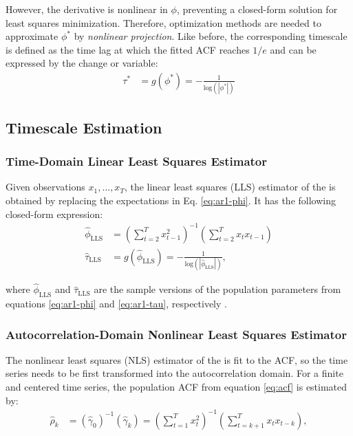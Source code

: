 \documentclass[main.tex]{subfiles}
\begin{document}
\noindent However, the derivative is nonlinear in $\phi$, preventing a closed-form solution for least squares minimization. Therefore, optimization methods are needed to approximate $\phi^*$ by \textit{nonlinear projection}. Like before, the corresponding timescale is defined as the time lag at which the fitted ACF reaches $1/e$ and can be expressed by the change or variable:
\begin{align}
    \tau^* &= g(\phi^*) = -\frac{1}{\text{log}(|\phi^*|)} \label{eq:nlm-tau}
\end{align}

\subsection{Timescale Estimation}\label{sec:timescale-estimation}
\subsubsection{Time-Domain Linear Least Squares Estimator}
Given observations $x_1, \ldots, x_T$, the linear least squares (LLS) estimator of the  is obtained by replacing the expectations in Eq. \eqref{eq:ar1-phi}. It has the following closed-form expression:
\begin{align}
    \hat\phi_{\scriptscriptstyle\text{LLS}} &= \left(\sum_{t=2}^T x_{t-1}^2\right)^{-1} \left(\sum_{t=2}^T x_t x_{t-1}\right)\\
    \hat\tau_{\scriptscriptstyle\text{LLS}} &= g(\hat\phi_{\scriptscriptstyle\text{LLS}}) = -\frac{1}{\text{log}(|\hat\phi_{\scriptscriptstyle\text{LLS}}|)},
\end{align}

\noindent where $\hat\phi_{\scriptscriptstyle\text{LLS}}$ and $\hat\tau_{\scriptscriptstyle\text{LLS}}$ are the sample versions of the population parameters from equations \eqref{eq:ar1-phi} and \eqref{eq:ar1-tau}, respectively \citep[Chapter~14.3]{hansen_econometrics_2022}.\\


\subsubsection{Autocorrelation-Domain Nonlinear Least Squares Estimator}
The nonlinear least squares (NLS) estimator of the  is fit to the ACF, so the time series needs to be first transformed into the autocorrelation domain. For a finite and centered time series, the population ACF from equation \eqref{eq:acf} is estimated by:
\begin{align}\label{eq:acf_}
    \hat\rho_k &= (\hat\gamma_0)^{-1}(\hat\gamma_k) = \left(\sum_{t=1}^T x_t^2\right)^{-1} \left(\sum_{t=k+1}^{T}x_t x_{t-k}\right),
\end{align}
\end{document}
